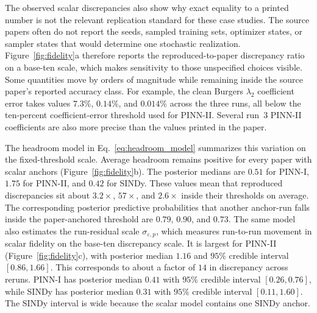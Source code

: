 \documentclass[authoryear,5p,times,nopreprintline]{elsarticle}
\begin{document}
The observed scalar discrepancies also show why exact equality to a printed number is not the relevant replication standard for these case studies.
The source papers often do not report the seeds, sampled training sets, optimizer states, or sampler states that would determine one stochastic realization.
Figure~\ref{fig:fidelity}a therefore reports the reproduced-to-paper discrepancy ratio on a base-ten scale, which makes sensitivity to those unspecified choices visible.
Some quantities move by orders of magnitude while remaining inside the source paper's reported accuracy class.
For example, the clean Burgers \(\lambda_2\) coefficient error takes values \(7.3\%\), \(0.14\%\), and \(0.014\%\) across the three runs, all below the ten-percent coefficient-error threshold used for PINN-II.
Several run~3 PINN-II coefficients are also more precise than the values printed in the paper.

The headroom model in Eq.~\eqref{eq:headroom_model} summarizes this variation on the fixed-threshold scale.
Average headroom remains positive for every paper with scalar anchors (Figure~\ref{fig:fidelity}b).
The posterior medians are \(0.51\) for PINN-I, \(1.75\) for PINN-II, and \(0.42\) for SINDy.
These values mean that reproduced discrepancies sit about \(3.2\times\), \(57\times\), and \(2.6\times\) inside their thresholds on average.
The corresponding posterior predictive probabilities that another anchor-run falls inside the paper-anchored threshold are \(0.79\), \(0.90\), and \(0.73\).
The same model also estimates the run-residual scale \(\sigma_{\varepsilon,p}\), which measures run-to-run movement in scalar fidelity on the base-ten discrepancy scale.
It is largest for PINN-II (Figure~\ref{fig:fidelity}c), with posterior median \(1.16\) and \(95\%\) credible interval \([0.86,1.66]\).
This corresponds to about a factor of \(14\) in discrepancy across reruns.
PINN-I has posterior median \(0.41\) with \(95\%\) credible interval \([0.26,0.76]\), while SINDy has posterior median \(0.31\) with \(95\%\) credible interval \([0.11,1.60]\).
The SINDy interval is wide because the scalar model contains one SINDy anchor.
\end{document}
